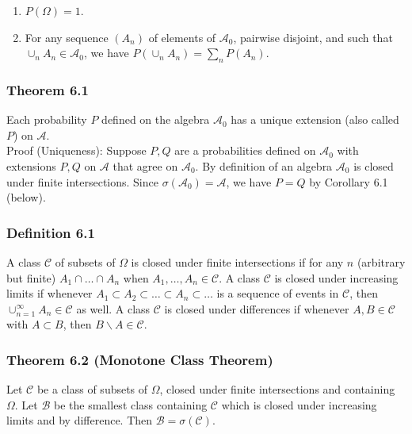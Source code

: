 \documentclass{article}
\begin{document}
{\begin{enumerate}
\item $P(\Omega) = 1$.

\item For any sequence $(A_n)$ of elements of $\mathcal{A}_0$, pairwise disjoint, and such that $\cup_n A_n \in \mathcal{A}_0$, we have $P\left(\cup_n A_n\right) = \sum_n P(A_n)$. 
\end{enumerate}

\subsubsection*{Theorem 6.1}

Each probability $P$ defined on the algebra $\mathcal{A}_0$ has a unique extension (also called $P$) on $\mathcal{A}$. \\

Proof (Uniqueness): Suppose $P,Q$ are a probabilities defined on $\mathcal{A}_0$ with extensions $P,Q$ on $\mathcal{A}$ that agree on $\mathcal{A}_0$. By definition of an algebra $\mathcal{A}_0$ is closed under finite intersections. Since $\sigma(\mathcal{A}_0) = \mathcal{A}$, we have $P = Q$ by Corollary 6.1 (below).

\subsubsection*{Definition 6.1} 

A class $\mathcal{C}$ of subsets of $\Omega$ is closed under finite intersections if for any $n$ (arbitrary but finite) $A_1 \cap \dots \cap A_n$ when $A_1, \dots, A_n \in \mathcal{C}$. A class $\mathcal{C}$ is closed under increasing limits if whenever $A_1 \subset A_2 \subset \dots \subset A_n \subset \dots$ is a sequence of events in $\mathcal{C}$, then $\cup_{n=1}^\infty A_n \in \mathcal{C}$ as well. A class $\mathcal{C}$ is closed under differences if whenever $A,B \in \mathcal{C}$ with $A \subset B$, then $B \backslash A \in \mathcal{C}$. 

\subsubsection*{Theorem 6.2 (Monotone Class Theorem)}

Let $\mathcal{C}$ be a class of subsets of $\Omega$, closed under finite intersections and containing $\Omega$. Let $\mathcal{B}$ be the smallest class containing $\mathcal{C}$  which is closed under increasing limits and by difference. Then $\mathcal{B} = \sigma(\mathcal{C})$. \\

}
\end{document}
